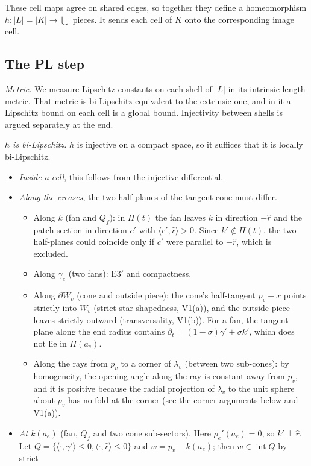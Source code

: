\documentclass[preprint,12pt]{elsarticle}
\theoremstyle{definition}
\theoremstyle{remark}
\newcommand{\inter}{\operatorname{int}}
\begin{document}
These cell maps agree on shared edges, so together they define a homeomorphism $h\colon|L|=|K|\to\bigcup$ pieces. It
sends each cell of $K$ onto the corresponding image cell.

\subsection{The PL step}
\emph{Metric.} We measure Lipschitz constants on each shell of $|L|$ in its intrinsic length metric. That metric is
bi-Lipschitz equivalent to the extrinsic one, and in it a Lipschitz bound on each cell is a global bound. Injectivity
between shells is argued separately at the end.

\emph{$h$ is bi-Lipschitz.} $h$ is injective on a compact space, so it suffices that it is locally bi-Lipschitz.
\begin{itemize}
\item \emph{Inside a cell}, this follows from the injective differential.
\item \emph{Along the creases}, the two half-planes of the tangent cone must differ.
  \begin{itemize}
  \item Along $k$ (fan and $Q_f$): in $\Pi(t)$ the fan leaves $k$ in direction $-\hat r$ and the patch section in
  direction $c'$ with $\langle c',\hat r\rangle>0$. Since $k'\notin\Pi(t)$, the two half-planes could coincide only if
  $c'$ were parallel to $-\hat r$, which is excluded.
  \item Along $\gamma_e$ (two fans): E3$'$ and compactness.
  \item Along $\partial W_v$ (cone and outside piece): the cone's half-tangent $p_v-x$ points strictly into $W_v$ (strict
  star-shapedness, V1(a)), and the outside piece leaves strictly outward (transversality, V1(b)). For a fan, the
  tangent plane along the end radius contains $\partial_t=(1-\sigma)\gamma'+\sigma k'$, which does not lie in $\Pi(a_e)$.
  \item Along the rays from $p_v$ to a corner of $\lambda_v$ (between two sub-cones): by homogeneity, the opening angle
  along the ray is constant away from $p_v$, and it is positive because the radial projection of $\lambda_v$ to the unit
  sphere about $p_v$ has no fold at the corner (see the corner arguments below and V1(a)).
  \end{itemize}
\item \emph{At $k(a_e)$} (fan, $Q_f$ and two cone sub-sectors). Here $\rho_e'(a_e)=0$, so $k'\perp\hat r$. Let
$Q=\{\langle\cdot,\gamma'\rangle\le0,\langle\cdot,\hat r\rangle\le0\}$ and $w=p_v-k(a_e)$; then $w\in\inter Q$ by strict

\end{itemize}
\end{document}
